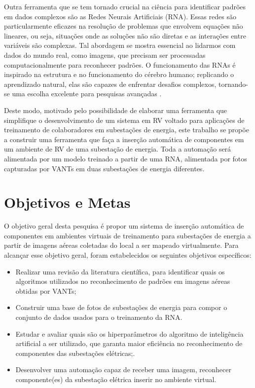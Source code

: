 Outra ferramenta que se tem tornado crucial na ciência para identificar padrões em dados complexos são as Redes Neurais Artificiais (RNA). Essas redes são particularmente eficazes na resolução de problemas que envolvem equações não lineares, ou seja, situações onde as soluções não são diretas e as interações entre variáveis são complexas. Tal abordagem se mostra essencial ao lidarmos com dados do mundo real, como imagens, que precisam ser processadas computacionalmente para reconhecer padrões. O funcionamento das RNAs é inspirado na estrutura e no funcionamento do cérebro humano; replicando o aprendizado natural, elas são capazes de enfrentar desafios complexos, tornando-se uma escolha excelente para pesquisas avançadas \cite{ougcu2012forecasting}.

Deste modo, motivado pelo possibilidade de elaborar uma ferramenta que simplifique o desenvolvimento de um sistema em RV voltado para aplicações de treinamento de colaboradores em subestações de energia, este trabalho se propõe a construir uma ferramenta que faça a inserção automática de componentes em um ambiente de RV de uma subestação de energia. Toda a automação será alimentada por um modelo treinado a partir de uma RNA, alimentada por fotos capturadas por VANTs em duas subestações de energia diferentes.

\section{Objetivos e Metas}

O objetivo geral desta pesquisa é propor um sistema de inserção automática de componentes em ambientes virtuais de treinamento para subestações de energia a partir  de imagens aéreas coletadas do local a ser mapeado virtualmente. Para alcançar esse objetivo geral, foram estabelecidos os seguintes objetivos específicos:

\begin{itemize}
\item Realizar uma revisão da literatura científica, para identificar quais os algoritmos utilizados no reconhecimento de padrões em imagens aéreas obtidas por VANTs;
\item Construir uma base de fotos de subestações de energia para compor o conjunto de dados usados para o treinamento da RNA.
\item Estudar e avaliar quais são os hiperparâmetros do algoritmo de inteligência artificial a ser utilizado, que garanta maior eficiência no reconhecimento de componentes das subestações elétricas;.
\item Desenvolver uma automação capaz de receber uma imagem, reconhecer componente(es) da subestação elétrica inserir no ambiente virtual.
\end{itemize}

